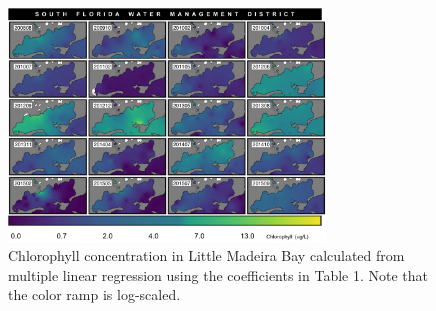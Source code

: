 \begin{figure}
  \centering
  \includegraphics[width=0.75\textwidth]{../../figures/multipanel_mb.png}
  \caption{Chlorophyll concentration in Little Madeira Bay calculated from multiple linear regression using the coefficients in Table 1. Note that the color ramp is log-scaled.}
  \label{fig:a4}
\end{figure}



